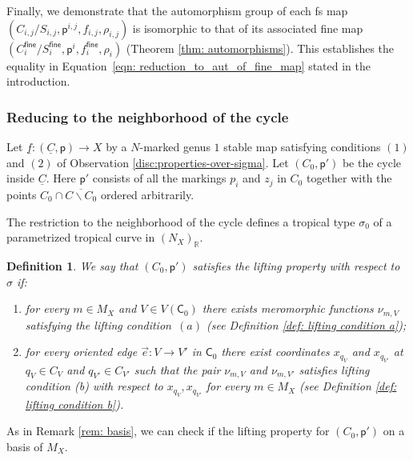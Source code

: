 \documentclass{article}
\def\R{\mathbb{R}}
\newtheorem{definition}{Definition}[section]
\newcommand{\tropC}{\mathsf{C}}
\begin{document}
Finally, we demonstrate that the automorphism group of each fs map $(C_{i,j}/S_{i,j}, \mathsf{p}^{i,j}, f_{i,j}, \rho_{i,j})$ is isomorphic to that of its associated fine map $(C_{i}^{\mathsf{fine}}/S_{i}^{\mathsf{fine}}, \mathsf{p}^{i}, f_{i}^{\mathsf{fine}}, \rho_{i})$ (Theorem \ref{thm: automorphisms}). This establishes the equality in Equation~\eqref{eqn: reduction_to_aut_of_fine_map} stated in the introduction.


\subsubsection{Reducing to the neighborhood of the cycle} 

Let $\underline{f}: (\underline{C},\mathsf{p}) \rightarrow X$ by a $N$-marked genus $1$ stable map satisfying conditions $(1)$ and $(2)$ of Observation \ref{disc:properties-over-sigma}. Let $(C_0, \mathsf{p}')$ be the cycle inside $\underline{C}$. Here $\mathsf{p}'$ consists of all the markings $p_i$ and $z_j$ in $C_0$ together with the points $C_0 \cap \overline{C \smallsetminus C_0}$ ordered arbitrarily. 





The restriction to the neighborhood of the cycle defines a tropical type $\sigma_0$ of a parametrized tropical curve in $(N_X)_\R$.

\begin{definition}\label{def: lifting property C0}
    We say that $(C_0, \mathsf{p}')$ satisfies the lifting property with respect to $\sigma$ if:
    \begin{enumerate}
        \item[$\bullet$] for every $m \in M_X$ and $V \in V(\tropC_0)$ there exists meromorphic functions $\nu_{m,V}$ satisfying the lifting condition~$(a)$ (see Definition \ref{def: lifting condition a});
        \item[$\bullet$] for every oriented edge $\vec{e}:V \to V'$ in $\tropC_0$ there exist coordinates $x_{q_V}$ and $x_{q_{V'}}$ at $q_V\in C_V$ and $q_{V'}\in C_{V'}$ such that the pair $\nu_{m,V}$ and $\nu_{m,V'}$ satisfies lifting condition (b) with respect to $x_{q_V}, x_{q_{V'}}$ for every $m \in M_X$ (see Definition \ref{def: lifting condition b}).
    \end{enumerate} 
\end{definition}


As in Remark \ref{rem: basis}, we can check if the lifting property for $(C_0, \mathsf{p}')$ on a basis of $M_X$. 
\end{document}
